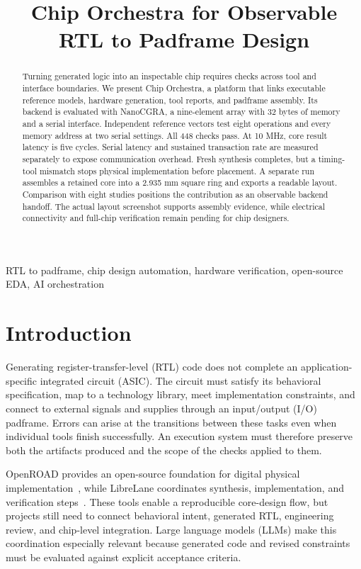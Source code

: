 \documentclass[conference,letterpaper]{IEEEtran}
\title{Chip Orchestra for Observable RTL to Padframe Design}
\author{\IEEEauthorblockN{Ade Irman Budi Hendrawan, William Anthony, Rifki Afriadi, Radhian Ferel Armansyah}
\IEEEauthorblockA{School of Electrical Engineering and Informatics\\Bandung Institute of Technology (ITB)\\Bandung, Indonesia\\
\{adeirman2705, willomooi, rifki.afriyadi, radhianarmansyah\}@gmail.com}}
\begin{document}
\maketitle
\begin{abstract}
Turning generated logic into an inspectable chip requires checks across tool and interface boundaries. We present Chip Orchestra, a platform that links executable reference models, hardware generation, tool reports, and padframe assembly. Its backend is evaluated with NanoCGRA, a nine-element array with 32 bytes of memory and a serial interface. Independent reference vectors test eight operations and every memory address at two serial settings. All 448 checks pass. At 10 MHz, core result latency is five cycles. Serial latency and sustained transaction rate are measured separately to expose communication overhead. Fresh synthesis completes, but a timing-tool mismatch stops physical implementation before placement. A separate run assembles a retained core into a 2.935 mm square ring and exports a readable layout. Comparison with eight studies positions the contribution as an observable backend handoff. The actual layout screenshot supports assembly evidence, while electrical connectivity and full-chip verification remain pending for chip designers.
\end{abstract}
\begin{IEEEkeywords}
RTL to padframe, chip design automation, hardware verification, open-source EDA, AI orchestration
\end{IEEEkeywords}

\section{Introduction}
Generating register-transfer-level (RTL) code does not complete an application-specific integrated circuit (ASIC). The circuit must satisfy its behavioral specification, map to a technology library, meet implementation constraints, and connect to external signals and supplies through an input/output (I/O) padframe. Errors can arise at the transitions between these tasks even when individual tools finish successfully. An execution system must therefore preserve both the artifacts produced and the scope of the checks applied to them.

OpenROAD provides an open-source foundation for digital physical implementation~\cite{openroad}, while LibreLane coordinates synthesis, implementation, and verification steps~\cite{librelane}. These tools enable a reproducible core-design flow, but projects still need to connect behavioral intent, generated RTL, engineering review, and chip-level integration. Large language models (LLMs) make this coordination especially relevant because generated code and revised constraints must be evaluated against explicit acceptance criteria.
\end{document}
